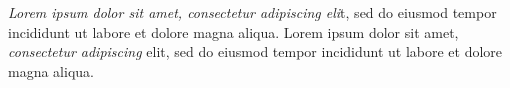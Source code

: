 \textit{Lorem ipsum dolor sit amet, consectetur adipiscing eli}t, sed do eiusmod tempor incididunt ut labore et dolore magna aliqua.
Lorem ipsum dolor sit amet,\textit{ consectetur adipiscing} elit, sed do eiusmod tempor incididunt ut labore et dolore magna aliqua.
